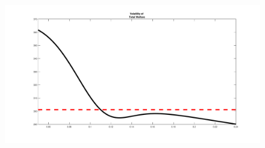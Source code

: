 \documentclass[12pt]{article}
\numberwithin{equation}{section}
\begin{document}
\begin{figure}[H]
\includegraphics[scale=0.2]{welfare_CAR_var.pdf}
\end{figure}









\end{document}
